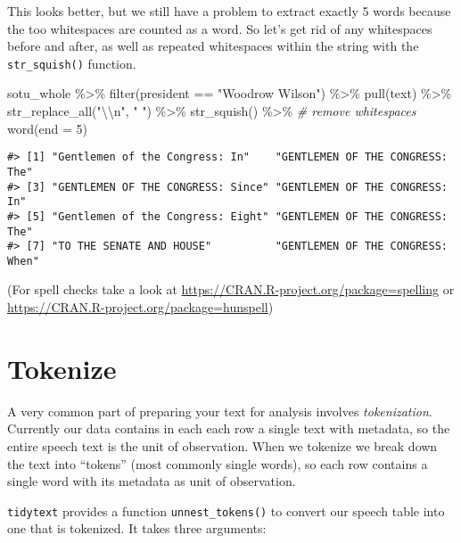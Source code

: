 \documentclass[
]{book}
\newenvironment{Shaded}{\begin{snugshade}}{\end{snugshade}}
\newcommand{\AttributeTok}[1]{\textcolor[rgb]{0.77,0.63,0.00}{#1}}
\newcommand{\CommentTok}[1]{\textcolor[rgb]{0.56,0.35,0.01}{\textit{#1}}}
\newcommand{\DecValTok}[1]{\textcolor[rgb]{0.00,0.00,0.81}{#1}}
\newcommand{\FunctionTok}[1]{\textcolor[rgb]{0.00,0.00,0.00}{#1}}
\newcommand{\NormalTok}[1]{#1}
\newcommand{\SpecialCharTok}[1]{\textcolor[rgb]{0.00,0.00,0.00}{#1}}
\newcommand{\StringTok}[1]{\textcolor[rgb]{0.31,0.60,0.02}{#1}}
\begin{document}
This looks better, but we still have a problem to extract exactly 5 words because the too whitespaces are counted as a word. So let's get rid of any whitespaces before and after, as well as repeated whitespaces within the string with the \texttt{str\_squish()} function.

\begin{Shaded}
\begin{Highlighting}[]
\NormalTok{sotu\_whole }\SpecialCharTok{\%\textgreater{}\%} 
  \FunctionTok{filter}\NormalTok{(president }\SpecialCharTok{==} \StringTok{"Woodrow Wilson"}\NormalTok{) }\SpecialCharTok{\%\textgreater{}\%}  
  \FunctionTok{pull}\NormalTok{(text) }\SpecialCharTok{\%\textgreater{}\%}
  \FunctionTok{str\_replace\_all}\NormalTok{(}\StringTok{"}\SpecialCharTok{\textbackslash{}\textbackslash{}}\StringTok{n"}\NormalTok{, }\StringTok{" "}\NormalTok{) }\SpecialCharTok{\%\textgreater{}\%} 
  \FunctionTok{str\_squish}\NormalTok{() }\SpecialCharTok{\%\textgreater{}\%}  \CommentTok{\# remove whitespaces}
  \FunctionTok{word}\NormalTok{(}\AttributeTok{end =} \DecValTok{5}\NormalTok{) }
\end{Highlighting}
\end{Shaded}

\begin{verbatim}
#> [1] "Gentlemen of the Congress: In"    "GENTLEMEN OF THE CONGRESS: The"  
#> [3] "GENTLEMEN OF THE CONGRESS: Since" "GENTLEMEN OF THE CONGRESS: In"   
#> [5] "Gentlemen of the Congress: Eight" "GENTLEMEN OF THE CONGRESS: The"  
#> [7] "TO THE SENATE AND HOUSE"          "GENTLEMEN OF THE CONGRESS: When"
\end{verbatim}

(For spell checks take a look at \url{https://CRAN.R-project.org/package=spelling} or \url{https://CRAN.R-project.org/package=hunspell})

\hypertarget{tokenize}{%
\section{Tokenize}\label{tokenize}}

A very common part of preparing your text for analysis involves \emph{tokenization}. Currently our data contains in each each row a single text with metadata, so the entire speech text is the unit of observation. When we tokenize we break down the text into ``tokens'' (most commonly single words), so each row contains a single word with its metadata as unit of observation.

\texttt{tidytext} provides a function \texttt{unnest\_tokens()} to convert our speech table into one that is tokenized. It takes three arguments:
\end{document}
